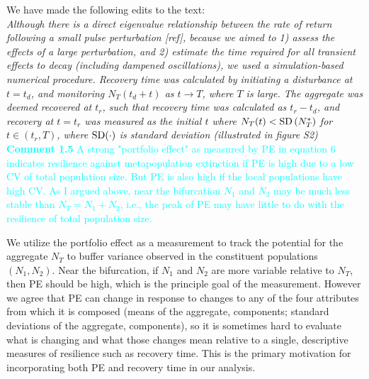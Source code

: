 \documentclass[ucm,12pt]{ucletter}
\begin{document}
\begin{letter}
\noindent We have made the following edits to the text:\\
 \emph{Although there is a direct eigenvalue relationship between the rate of return following a small pulse perturbation [ref], because we aimed to 1) assess the effects of a large perturbation, and 2) estimate the time required for all transient effects to decay (including dampened oscillations), we used a simulation-based numerical procedure.
Recovery time was calculated by initiating a disturbance at $t=t_d$, and monitoring $N_T(t_d+t)$ as $t\rightarrow T$, where $T$ is large. 
The aggregate was deemed recovered at $t_r$, such that recovery time was calculated as $t_r-t_d$, and recovery at $t=t_r$ was measured as the initial $t$ where $N_T(t) < {\rm SD}\left( N_T^* \right)$ for $t\in(t_r,T)$, where $\rm{SD}(\cdot)$ is standard deviation (illustrated in figure S2)}\\

\noindent \textcolor{cyan}{
{\bf Comment 1.5} A strong "portfolio effect" as measured by PE in equation 6 indicates resilience against metapopulation extinction if PE is high due to a low CV of total population size. But PE is also high if the local populations have high CV. As I argued above, near the bifurcation $N_1$ and $N_2$ may be much less stable than $N_T=N_1+N_2$, i.e., the peak of PE may have little to do with the resilience of total population size.
}

 We utilize the portfolio effect as a measurement to track the potential for the aggregate $N_T$ to buffer variance observed in the constituent populations $(N_1,N_2)$. Near the bifurcation, if $N_1$ and $N_2$ are more variable relative to $N_T$, then PE should be high, which is the principle goal of the measurement. 
However we agree that PE can change in response to changes to any of the four attributes from which it is composed (means of the aggregate, components; standard deviations of the aggregate, components), so it is sometimes hard to evaluate what is changing and what those changes mean relative to a single, descriptive measures of resilience such as recovery time. This is the primary motivation for incorporating both PE and recovery time in our analysis. 



\end{letter}
\end{document}
